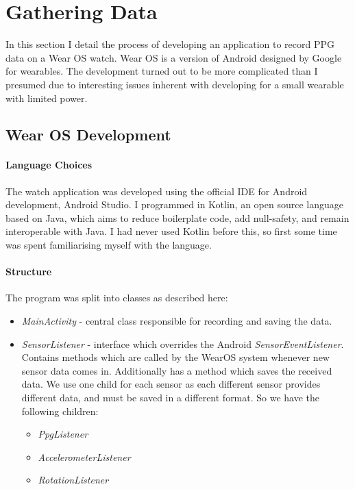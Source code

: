 \documentclass[12pt,a4paper,twoside,openany]{report}
\begin{document}
\section{Gathering Data}

In this section I detail the process of developing an
application to record PPG data on a Wear OS watch. Wear OS is a version of
Android designed by Google for wearables. The development turned out to be more
complicated than I presumed due to interesting issues inherent with developing for a small
wearable with limited power.

\subsection{Wear OS Development}

\paragraph{Language Choices}

The watch application was developed using the official IDE for Android
development, Android Studio. I programmed in 
Kotlin, an open source language based on Java, which aims to
reduce boilerplate code, add null-safety, and remain interoperable with
Java. I had never used Kotlin before this, so first some time was spent
familiarising myself with the
language.

\paragraph{Structure}

The program was split into classes as described here:

\begin{itemize}
	\item \emph{MainActivity} - central class responsible for 
		recording and saving the data.

	\item \emph{SensorListener} - interface which overrides the Android
		\emph{SensorEventListener}. Contains methods which
		are called by the WearOS system whenever new sensor data comes
		in. Additionally has a method which saves the received data.
		We use one child for each sensor as each different sensor
		provides different data, and must be saved in a different
		format. So we have the following children:

	\begin{itemize}
		\item \emph{PpgListener}
		\item \emph{AccelerometerListener}
		\item \emph{RotationListener}
	\end{itemize}

\end{itemize}
\end{document}
